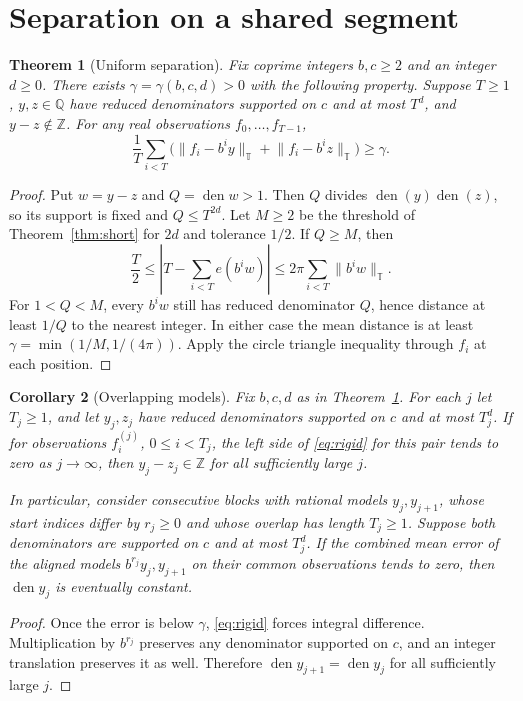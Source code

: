 \documentclass[11pt]{article}
\newtheorem{theorem}{Theorem}
\newtheorem{corollary}[theorem]{Corollary}
\newcommand{\Q}{\mathbb Q}
\newcommand{\Z}{\mathbb Z}
\newcommand{\T}{\mathbb T}
\newcommand{\circabs}[1]{\lVert #1\rVert_{\T}}
\DeclareMathOperator{\den}{den}
\begin{document}
\section{Separation on a shared segment}\label{sec:rigidity}
\begin{theorem}[Uniform separation]\label{thm:rigidity}
Fix coprime integers \(b,c\ge2\) and an integer \(d\ge0\). There exists \(\gamma=\gamma(b,c,d)>0\) with the following property. Suppose \(T\ge1\), \(y,z\in\Q\) have reduced denominators supported on \(c\) and at most \(T^d\), and \(y-z\notin\Z\). For any real observations \(f_0,\ldots,f_{T-1}\),
\begin{equation}\label{eq:rigid}
 \frac1T\sum_{i<T}\big(\circabs{f_i-b^iy}+\circabs{f_i-b^iz}\big)\ge\gamma .
\end{equation}
\end{theorem}
\begin{proof}
Put \(w=y-z\) and \(Q=\den w>1\). Then \(Q\) divides \(\den(y)\den(z)\), so its support is fixed and \(Q\le T^{2d}\). Let \(M\ge2\) be the threshold of Theorem~\ref{thm:short} for \(2d\) and tolerance \(1/2\). If \(Q\ge M\), then
\[
 \frac T2\le \left|T-\sum_{i<T}e(b^iw)\right|
      \le 2\pi\sum_{i<T}\circabs{b^iw}.
\]
For \(1<Q<M\), every \(b^iw\) still has reduced denominator \(Q\), hence distance at least \(1/Q\) to the nearest integer. In either case the mean distance is at least \(\gamma=\min(1/M,1/(4\pi))\). Apply the circle triangle inequality through \(f_i\) at each position.
\end{proof}

\begin{corollary}[Overlapping models]\label{cor:chain}
Fix \(b,c,d\) as in Theorem~\ref{thm:rigidity}. For each \(j\) let \(T_j\ge1\), and let \(y_j,z_j\) have reduced denominators supported on \(c\) and at most \(T_j^d\). If for observations \(f^{(j)}_i\), \(0\le i<T_j\), the left side of \eqref{eq:rigid} for this pair tends to zero as \(j\to\infty\), then \(y_j-z_j\in\Z\) for all sufficiently large \(j\).

In particular, consider consecutive blocks with rational models \(y_j,y_{j+1}\), whose start indices differ by \(r_j\ge0\) and whose overlap has length \(T_j\ge1\). Suppose both denominators are supported on \(c\) and at most \(T_j^d\). If the combined mean error of the aligned models \(b^{r_j}y_j,y_{j+1}\) on their common observations tends to zero, then \(\den y_j\) is eventually constant.
\end{corollary}
\begin{proof}
Once the error is below \(\gamma\), \eqref{eq:rigid} forces integral difference. Multiplication by \(b^{r_j}\) preserves any denominator supported on \(c\), and an integer translation preserves it as well. Therefore \(\den y_{j+1}=\den y_j\) for all sufficiently large \(j\).
\end{proof}
\end{document}
